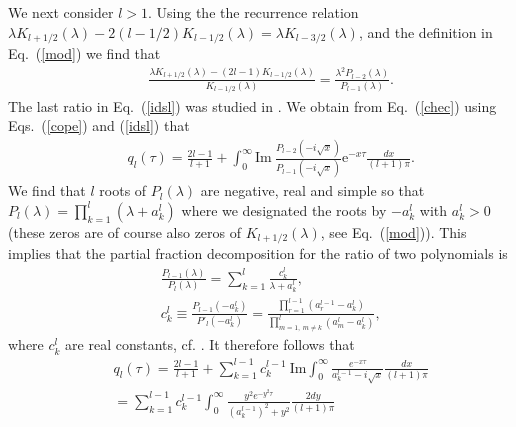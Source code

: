 \documentclass[aps,prx,twocolumn,amsmath,amssymb,amsfonts]{revtex4-2}
\newcommand{\rIm}{\mathrm{Im}}
\newcommand{\re}{\mathrm{e}}            %
\begin{document}
We next consider $l>1$. Using the the recurrence relation $\lambda K_{l+1/2}(\lambda)-2(l-1/2)K_{l-1/2}(\lambda)=\lambda K_{l-3/2}(\lambda)$, and the definition in Eq.~(\ref{mod}) we find that
\begin{eqnarray}&&
\frac{\lambda K_{l+1/2}(\lambda)-(2l-1)K_{l-1/2}(\lambda)}{K_{l-1/2}(\lambda)}=\frac{\lambda^2 P_{l-2}(\lambda)}{P_{l-1}(\lambda)}.\label{idsl}
\end{eqnarray}
The last ratio in Eq.~(\ref{idsl}) was studied in \cite{Ishimoto}.
We obtain from Eq.~(\ref{chec}) using Eqs.~(\ref{cope}) and (\ref{idsl})  that
\begin{eqnarray}&&\!\!\!\!\!\!
q_l(\tau)\!=\!\frac{2l\!-\!1}{l+1}%
\!+\!\int_{0}^{\infty}\!\! \rIm\ \frac{P_{l-2}(-i\sqrt{x})}{P_{l-1}(-i\sqrt{x})}\re^{-x\tau }\frac{dx}{(l\!+\!1)\pi}.
\end{eqnarray}
We find that $l$ roots of $P_l(\lambda)$ are negative, real and simple so that $P_l(\lambda)=\prod_{k=1}^l(\lambda+a_k^l)$ where we designated the roots by $-a_k^l$ with $a_k^l>0$ (these zeros are of course also zeros of $K_{l+1/2}(\lambda)$, see Eq.~(\ref{mod})). This implies that the partial fraction decomposition for the ratio of two polynomials is
\begin{eqnarray}&&\!\!
\frac{P_{l-1}(\lambda)}{P_{l}(\lambda)}\!=\!\sum_{k=1}^{l} \! \frac{c_k^{l}}{\lambda\!+\!a_k^{l}},\label{dec}\\&&\!\! c_k^{l}\!\equiv \!\frac{P_{l-1}(-a_k^{l})}{P'_{l}(-a_k^{l})}\!=\!\frac{\prod_{r=1}^{l-1}(a_r^{l-1}\!-\!a_k^{l})}{\prod_{m=1,\ m\neq k}^{l}(a_m^{l}\!-\!a_k^{l})},\nonumber
\end{eqnarray}
where $c_k^{l}$ are real constants, cf. \cite{Ishimoto}. It therefore follows that
\begin{eqnarray}&&\!\!\!\!
q_l(\tau)\!=\!\frac{2l\!-\!1}{l+1}\!+\!\sum_{k=1}^{l-1}\! c_k^{l-1}\ \rIm \int_{0}^{\infty} \!\!\frac{e^{-x\tau}}{a_k^{l-1}\!-\!i\sqrt{x}}\frac{dx}{(l\!+\!1)\pi}\nonumber\\&&
=\sum_{k=1}^{l-1} c_k^{l-1} \int_{0}^{\infty} \frac{y^2 e^{-y^2\tau}}{(a_k^{l-1})^2+y^2}\frac{2dy}{(l+1)\pi}
\end{eqnarray}
\end{document}
